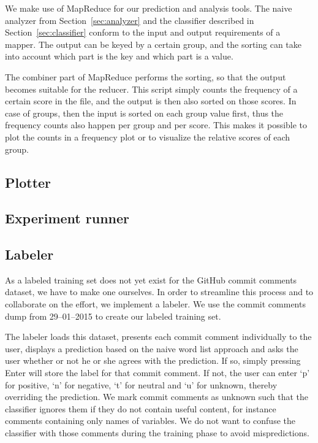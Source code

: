 \documentclass{article}
\begin{document}
We make use of MapReduce for our prediction and analysis tools. The naive 
analyzer from Section~\ref{sec:analyzer} and the classifier described in 
Section~\ref{sec:classifier} conform to the input and output requirements of 
a mapper. The output can be keyed by a certain group, and the sorting can take 
into account which part is the key and which part is a value.

The combiner part of MapReduce performs the sorting, so that the output becomes 
suitable for the reducer. This script simply counts the frequency of a certain 
score in the file, and the output is then also sorted on those scores. In case 
of groups, then the input is sorted on each group value first, thus the 
frequency counts also happen per group and per score. This makes it possible to 
plot the counts in a frequency plot or to visualize the relative scores of each 
group.

\subsection{Plotter}\label{sec:plotter}

\subsection{Experiment runner}\label{sec:experiment_runner}

\subsection{Labeler}\label{sec:labeler}
As a labeled training set does not yet exist for the GitHub commit comments
dataset, we have to make one ourselves. In order to streamline this process
and to collaborate on the effort, we implement a labeler. We use the commit
comments dump from 29--01--2015 to create our labeled training set.

The labeler loads this dataset, presents each commit comment individually to
the user, displays a prediction based on the naive word list approach and asks
the user whether or not he or she agrees with the prediction. If so, simply
pressing Enter will store the label for that commit comment. If not, the user
can enter `p' for positive, `n' for negative, `t' for neutral and `u' for
unknown, thereby overriding the prediction. We mark commit comments as unknown
such that the classifier ignores them if they do not contain useful content,
for instance comments containing only names of variables. We do not want to
confuse the classifier with those comments during the training phase to avoid
mispredictions.
\end{document}
